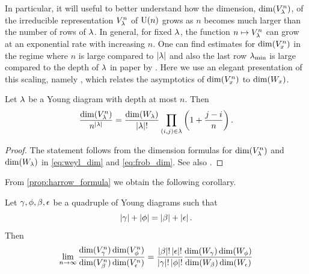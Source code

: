 \documentclass[notitlepage, 10pt]{article}
\begin{document}
In particular, it will useful to better understand how the dimension, $\dim(V_{\lambda}^{n})$, of the irreducible representation $V_{\lambda}^{n}$ of $\operatorname{U}(n)$ grows as $n$ becomes much larger than the number of rows of $\lambda$.
In general, for fixed $\lambda$, the function $n \mapsto V_{\lambda}^{n}$ can grow at an exponential rate with increasing $n$.
One can find estimates for $\dim(V_{x}^{n})$ in the regime where $n$ is large compared to $\left|\lambda\right|$ and also the last row $\lambda_{\min}$ is large compared to the depth of $\lambda$ in paper by  \cite[Section III]{itzykson1966unitary}.
Here we use an elegant presentation of this scaling, namely \cite[Lemma 2]{harrow2023approximate}, which relates the asymptotics of $\dim(V_{x}^{n})$ to $\dim(W_{x})$.
\begin{prop}
    \label{prop:harrow_formula}
    Let $\lambda$ be a Young diagram with depth at most $n$. Then
    \begin{equation}
        \frac{\dim(V_{\lambda}^{n})}{n^{\left|\lambda\right|}} = \frac{\dim(W_{\lambda})}{\left|\lambda\right|!}\prod_{(i,j) \in \lambda} \left(1 + \frac{j-i}{n}\right).
    \end{equation}
\end{prop}
\begin{proof}
    The statement follows from the dimension formulas for $\dim(V_{\lambda}^{n})$ and $\dim(W_{\lambda})$ in \cref{eq:weyl_dim} and \cref{eq:frob_dim}. See also \cite[Appendix A]{harrow2023approximate}.
\end{proof}
From \cref{prop:harrow_formula} we obtain the following corollary.
\begin{cor}
    \label{cor:harrow_ssa_lim}
    Let $\gamma,\phi,\beta,\epsilon$ be a quadruple of Young diagrams such that 
    \begin{equation}
        \label{eq:balanced_sizes}
        \left|\gamma\right|+\left|\phi\right| = \left|\beta\right|+\left|\epsilon\right|.
    \end{equation}
    Then
    \begin{equation}
        \lim_{n\to\infty} 
        \frac{\dim(V_{\gamma}^n) \dim(V_{\phi}^n)}{\dim(V_{\beta}^n) \dim(V_{\epsilon}^n)} = 
        \frac{\left|\beta\right|!\left|\epsilon\right|!}{\left|\gamma\right|!\left|\phi\right|!}
        \frac{\dim(W_{\gamma}) \dim(W_{\phi})}{\dim(W_{\beta}) \dim(W_{\epsilon})} 
    \end{equation}
\end{cor}
\end{document}
